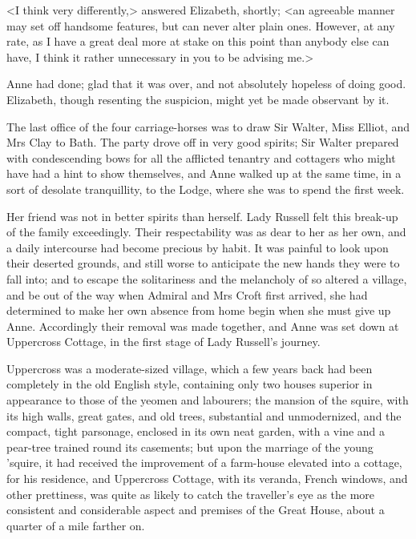 <I think very differently,> answered Elizabeth, shortly; <an agreeable manner may set off handsome features, but can never alter plain ones. However, at any rate, as I have a great deal more at stake on this point than anybody else can have, I think it rather unnecessary in you to be advising me.>

Anne had done; glad that it was over, and not absolutely hopeless of doing good. Elizabeth, though resenting the suspicion, might yet be made observant by it.

The last office of the four carriage-horses was to draw Sir Walter, Miss Elliot, and Mrs Clay to Bath. The party drove off in very good spirits; Sir Walter prepared with condescending bows for all the afflicted tenantry and cottagers who might have had a hint to show themselves, and Anne walked up at the same time, in a sort of desolate tranquillity, to the Lodge, where she was to spend the first week.

Her friend was not in better spirits than herself. Lady Russell felt this break-up of the family exceedingly. Their respectability was as dear to her as her own, and a daily intercourse had become precious by habit. It was painful to look upon their deserted grounds, and still worse to anticipate the new hands they were to fall into; and to escape the solitariness and the melancholy of so altered a village, and be out of the way when Admiral and Mrs Croft first arrived, she had determined to make her own absence from home begin when she must give up Anne. Accordingly their removal was made together, and Anne was set down at Uppercross Cottage, in the first stage of Lady Russell's journey.

Uppercross was a moderate-sized village, which a few years back had been completely in the old English style, containing only two houses superior in appearance to those of the yeomen and labourers; the mansion of the squire, with its high walls, great gates, and old trees, substantial and unmodernized, and the compact, tight parsonage, enclosed in its own neat garden, with a vine and a pear-tree trained round its casements; but upon the marriage of the young 'squire, it had received the improvement of a farm-house elevated into a cottage, for his residence, and Uppercross Cottage, with its veranda, French windows, and other prettiness, was quite as likely to catch the traveller's eye as the more consistent and considerable aspect and premises of the Great House, about a quarter of a mile farther on.

